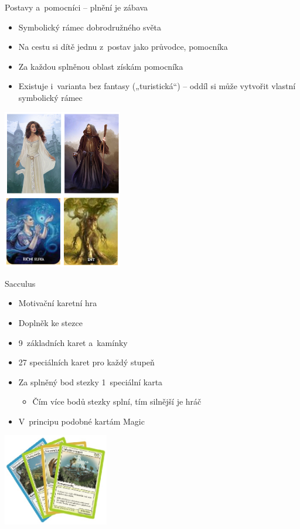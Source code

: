 \documentclass[compress,xelatex,xcolor=dvipsnames,print]{beamer}
\begin{document}
\begin{frame}{Postavy a~pomocníci -- plnění je zábava}
\begin{multicols}{2}
\begin{itemize}
\item Symbolický rámec dobrodružného světa
\item Na cestu si dítě jednu z~postav jako průvodce, pomocníka
\item Za každou splněnou oblast získám pomocníka
\item Existuje i~varianta bez fantasy („turistická“) -- oddíl si může vytvořit vlastní symbolický rámec
\end{itemize}
\columnbreak
\includegraphics[height=7cm]{postavy.png}
\end{multicols}
\end{frame}

\begin{frame}{Sacculus}
\begin{multicols}{2}
\begin{itemize}
\item Motivační karetní hra
\item Doplněk ke stezce
\item 9~základních karet a~kamínky
\item 27 speciálních karet pro každý stupeň
\item Za splněný bod stezky 1~speciální karta
\begin{itemize}
 \item Čím více bodů stezky splní, tím silnější je hráč
\end{itemize}
\item V~principu podobné kartám Magic
\end{itemize}
\columnbreak
\includegraphics[height=4cm]{sacculus.png}
\end{multicols}
\end{frame}
\end{document}
